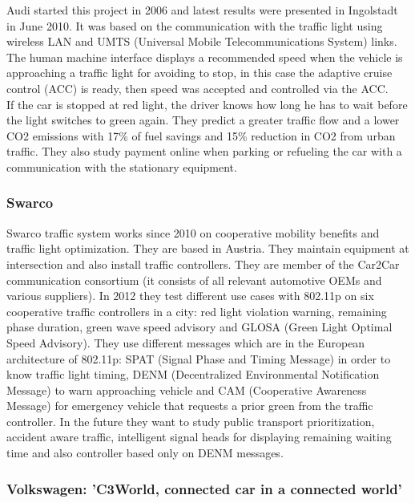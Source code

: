 \documentclass[a4paper]{article}
\begin{document}
Audi \cite{AudiTrav} started this project in 2006 and latest results were presented in Ingolstadt in June 2010. It was based on the communication with the traffic light using wireless LAN and UMTS (Universal Mobile Telecommunications System) links. The human machine interface displays a recommended speed when the vehicle is approaching a traffic light for avoiding to stop, in this case the adaptive cruise control (ACC) is ready, then speed was accepted and controlled via the ACC.\\
If the car is stopped at red light, the driver knows how long he has to wait before the light switches to green again. They predict a greater traffic flow and a lower CO2 emissions with 17\% of fuel savings and 15\% reduction in CO2 from urban traffic. They also study payment online when parking or refueling the car with a communication with the stationary equipment.

\subsubsection{Swarco}

Swarco traffic system works since 2010 on cooperative mobility benefits and traffic light optimization. They are based in Austria. They maintain equipment at intersection and also install traffic controllers. They are member of the Car2Car communication consortium (it consists of all relevant automotive OEMs and various suppliers). In 2012 they test different use cases with 802.11p on six cooperative traffic controllers in a city: red light violation warning, remaining phase duration, green wave speed advisory and GLOSA (Green Light Optimal Speed Advisory). They use different messages which are in the European architecture of 802.11p: SPAT (Signal Phase and Timing Message) in order to know traffic light timing, DENM (Decentralized Environmental Notification Message) to warn approaching vehicle and CAM (Cooperative Awareness Message) for emergency vehicle that requests a prior green from the traffic controller. In the future they want to study public transport prioritization, accident aware traffic, intelligent signal heads for displaying remaining waiting time and also controller based only on DENM messages.

\subsubsection{Volkswagen: 'C3World, connected car in a connected world'}
\end{document}
